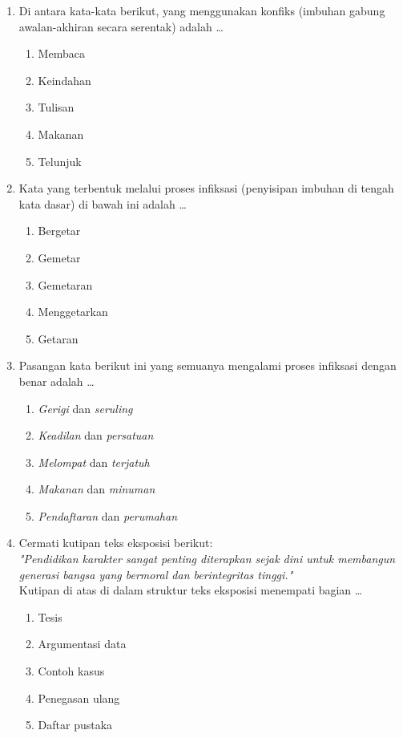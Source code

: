 \documentclass[12pt,a4paper]{article}
\begin{document}
\begin{enumerate}[leftmargin=*]
\item Di antara kata-kata berikut, yang menggunakan konfiks (imbuhan gabung awalan-akhiran secara serentak) adalah \dots
    \begin{enumerate}[label=\alph*.]
        \item Membaca
        \item Keindahan
        \item Tulisan
        \item Makanan
        \item Telunjuk
    \end{enumerate}

\item Kata yang terbentuk melalui proses infiksasi (penyisipan imbuhan di tengah kata dasar) di bawah ini adalah \dots
    \begin{enumerate}[label=\alph*.]
        \item Bergetar
        \item Gemetar
        \item Gemetaran
        \item Menggetarkan
        \item Getaran
    \end{enumerate}

\item Pasangan kata berikut ini yang semuanya mengalami proses infiksasi dengan benar adalah \dots
    \begin{enumerate}[label=\alph*.]
        \item \textit{Gerigi} dan \textit{seruling}
        \item \textit{Keadilan} dan \textit{persatuan}
        \item \textit{Melompat} dan \textit{terjatuh}
        \item \textit{Makanan} dan \textit{minuman}
        \item \textit{Pendaftaran} dan \textit{perumahan}
    \end{enumerate}

\item Cermati kutipan teks eksposisi berikut:\\
\textit{"Pendidikan karakter sangat penting diterapkan sejak dini untuk membangun generasi bangsa yang bermoral dan berintegritas tinggi."}\\
Kutipan di atas di dalam struktur teks eksposisi menempati bagian \dots
    \begin{enumerate}[label=\alph*.]
        \item Tesis
        \item Argumentasi data
        \item Contoh kasus
        \item Penegasan ulang
        \item Daftar pustaka
    \end{enumerate}


\end{enumerate}
\end{document}
